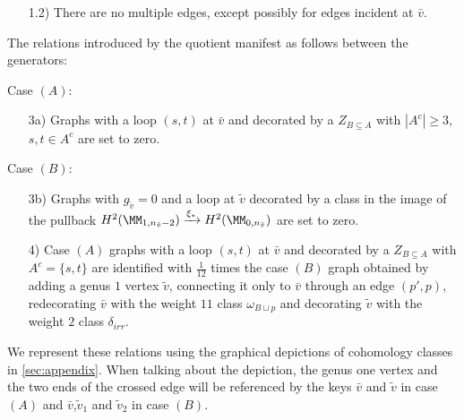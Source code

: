 \begin{enumerate}
    \item[1.2)] There are no multiple edges, except possibly for edges incident at $\bar{v}$.
\end{enumerate}

The relations introduced by the quotient manifest as follows between the generators:\\
\begin{minipage}[t]{0.44\textwidth}
Case $(A)$:
\begin{enumerate}
    \item[3a)] Graphs with a loop $(s,t)$ at $\bar{v}$ and decorated by a $Z_{B\subseteq A}$ with $|A^c|\geq 3$, $s,t\in A^c$ are set to zero.
\end{enumerate}
\end{minipage}
\begin{minipage}[t]{0.56\textwidth}
Case $(B)$:
\begin{enumerate}
    \item[3b)] Graphs with $g_{\tilde{v}}=0$ and a loop at $\tilde{v}$ decorated by a class in the image of the pullback $H^2(\MM_{1,n_{\tilde{v}}-2})\xrightarrow{\xi_{*}} H^2(\MM_{0,n_{\tilde{v}}})$ are set to zero. 
\end{enumerate}
\end{minipage}%
\begin{enumerate}
    \item[4)] Case $(A)$ graphs with a loop $(s,t)$ at $\bar{v}$ and decorated by a $Z_{B\subseteq A}$ with $A^c=\{s,t\}$ are identified with $\frac{1}{12}$ times the case $(B)$ graph obtained by adding a genus $1$ vertex $\tilde{v}$, connecting it only to $\bar{v}$ through an edge $(p',p)$, redecorating $\bar{v}$ with the weight $11$ class $\omega_{B\sqcup p}$ and decorating $\tilde{v}$ with the weight $2$ class $\delta_{irr}$.
\end{enumerate}

We represent these relations using the graphical depictions of cohomology classes in \ref{sec:appendix}. When talking about the depiction, the genus one vertex and the two ends of the crossed edge will be referenced by the keys $\bar{v}$ and $\tilde{v}$ in case $(A)$ and  $\bar{v}$,$\tilde{v}_1$ and $\tilde{v}_2$ in case $(B)$.

